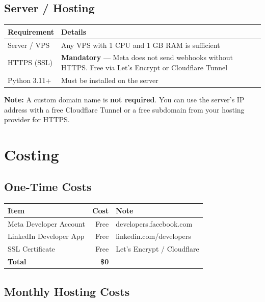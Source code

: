 \documentclass[12pt,a4paper]{article}
\begin{document}
\subsection{Server / Hosting}

\begin{tabularx}{\textwidth}{lX}
\toprule
\textbf{Requirement} & \textbf{Details} \\
\midrule
Server / VPS & Any VPS with 1 CPU and 1 GB RAM is sufficient \\[0.3em]
HTTPS (SSL) & \textbf{Mandatory} --- Meta does not send webhooks without HTTPS. Free via Let's Encrypt or Cloudflare Tunnel \\[0.3em]
Python 3.11+ & Must be installed on the server \\
\bottomrule
\end{tabularx}

\begin{tcolorbox}[colback=blue!3, colframe=pri, boxrule=0.4pt]
\textbf{Note:} A custom domain name is \textbf{not required}. You can use the server's IP address with a free Cloudflare Tunnel or a free subdomain from your hosting provider for HTTPS.
\end{tcolorbox}

\newpage
\section{Costing}

\subsection{One-Time Costs}

\begin{tabularx}{\textwidth}{Xrl}
\toprule
\textbf{Item} & \textbf{Cost} & \textbf{Note} \\
\midrule
Meta Developer Account & Free & developers.facebook.com \\
LinkedIn Developer App & Free & linkedin.com/developers \\
SSL Certificate & Free & Let's Encrypt / Cloudflare \\
\midrule
\textbf{Total} & \textbf{\$0} & \\
\bottomrule
\end{tabularx}

\subsection{Monthly Hosting Costs}
\end{document}
